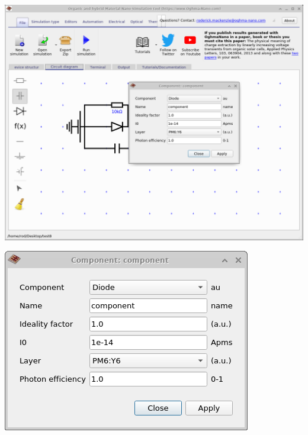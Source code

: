 \noindent
\begin{minipage}{0.5\textwidth}
	\centering
	\includegraphics[width=\linewidth,height=0.8\linewidth]{./images/circuit/edit_component.png}
	\label{fig:circuit_edit_component}
\end{minipage}
\hspace{4pt}
\begin{minipage}[]{0.5\linewidth}
	\centering
	\includegraphics[width=\linewidth,height=0.8\linewidth]{./images/circuit/circuit_edit_component_zoom.png}
	\label{fig:circuit_edit_component_zoom}
\end{minipage}

